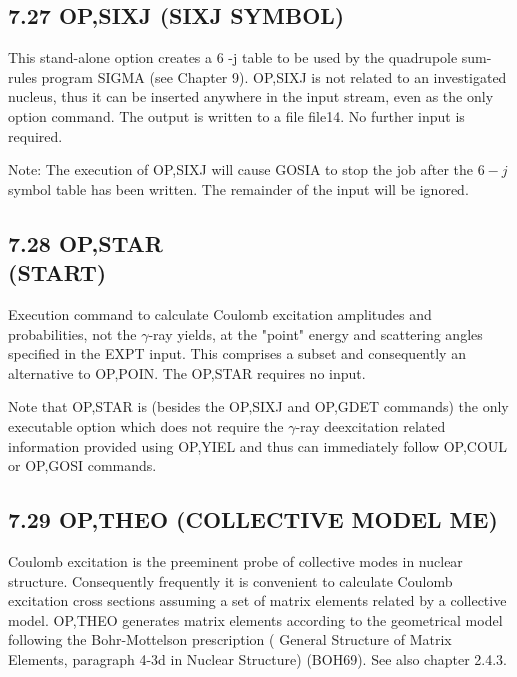 \documentclass[10pt]{article}
\begin{document}
\subsection*{7.27 OP,SIXJ (SIXJ SYMBOL)}
This stand-alone option creates a 6 -j table to be used by the quadrupole sum-rules program SIGMA (see Chapter 9). OP,SIXJ is not related to an investigated nucleus, thus it can be inserted anywhere in the input stream, even as the only option command. The output is written to a file file14. No further input is required.

Note: The execution of OP,SIXJ will cause GOSIA to stop the job after the $6-j$ symbol table has been written. The remainder of the input will be ignored.

\subsection*{7.28 OP,STAR \\
 (START)}
Execution command to calculate Coulomb excitation amplitudes and probabilities, not the $\gamma$-ray yields, at the "point" energy and scattering angles specified in the EXPT input. This comprises a subset and consequently an alternative to OP,POIN. The OP,STAR requires no input.

Note that OP,STAR is (besides the OP,SIXJ and OP,GDET commands) the only executable option which does not require the $\gamma$-ray deexcitation related information provided using OP,YIEL and thus can immediately follow OP,COUL or OP,GOSI commands.

\subsection*{7.29 OP,THEO (COLLECTIVE MODEL ME)}
Coulomb excitation is the preeminent probe of collective modes in nuclear structure. Consequently frequently it is convenient to calculate Coulomb excitation cross sections assuming a set of matrix elements related by a collective model. OP,THEO generates matrix elements according to the geometrical model following the Bohr-Mottelson prescription ( General Structure of Matrix Elements, paragraph 4-3d in Nuclear Structure) (BOH69). See also chapter 2.4.3.
\end{document}

